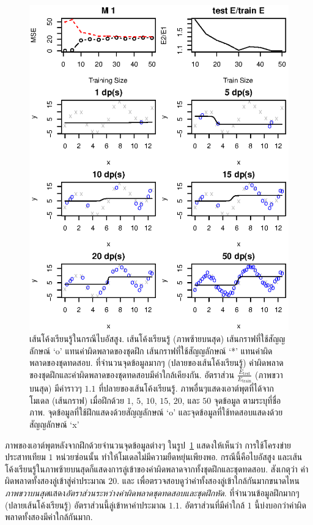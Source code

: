 %
\begin{figure}
\begin{center}
\includegraphics[width=5.5in]{04ANNlearncurve/LCHiBiasM1.eps}
\end{center}
\caption{เส้นโค้งเรียนรู้ในกรณีไบอัสสูง. 
เส้นโค้งเรียนรู้ (ภาพซ้ายบนสุด) 
เส้นกราฟที่ใช้สัญญลักษณ์ `o' แทนค่าผิดพลาดของชุดฝึก
เส้นกราฟที่ใช้สัญญลักษณ์ `*' แทนค่าผิดพลาดของชุดทดสอบ.
ที่จำนวนจุดข้อมูลมากๆ (ปลายของเส้นโค้งเรียนรู้) ค่าผิดพลาดของชุดฝึกและค่าผิดพลาดของชุดทดสอบมีค่าใกล้เคียงกัน. 
อัตราส่วน $\frac{E_{\mathrm{test}}}{E_{\mathrm{train}}}$ (ภาพขวาบนสุด) มีค่าราวๆ $1.1$ ที่ปลายของเส้นโค้งเรียนรู้.
ภาพอื่นๆแสดงเอาต์พุตที่ได้จากโมเดล (เส้นกราฟ) เมื่อฝึกด้วย $1$, $5$, $10$, $15$, $20$, และ $50$ จุดข้อมูล ตามระบุที่ชื่อภาพ.
จุดข้อมูลที่ใช้ฝึกแสดงด้วยสัญญลักษณ์ `o' และจุดข้อมูลที่ใช้ทดสอบแสดงด้วยสัญญลักษณ์ `x'
}
\label{fig: more ann learning curve high bias M1}
\end{figure}

ภาพของเอาต์พุตหลังจากฝึกด้วยจำนวนจุดข้อมูลต่างๆ ในรูป~\ref{fig: more ann learning curve high bias M1} แสดงให้เห็นว่า การใช้โครงข่ายประสาทเทียม $1$ หน่วยซ่อนนั้น ทำให้โมเดลไม่มีความยืดหยุ่นเพียงพอ.
กรณีนี้คือไบอัสสูง และเส้นโค้งเรียนรู้ในภาพซ้ายบนสุดก็แสดงการลู่เข้าของค่าผิดพลาดจากทั้งชุดฝึกและชุดทดสอบ.
สังเกตุว่า ค่าผิดพลาดทั้งสองลู่เข้าสู่ค่าประมาณ $20$.
และ เพื่อตรวจสอบดูว่าค่าทั้งสองลู่เข้าใกล้กันมากขนาดไหน 
\textit{ภาพขวาบนสุด}แสดง\textit{อัตราส่วนระหว่างค่าผิดพลาดชุดทดสอบและชุดฝึกหัด}.
ที่จำนวนข้อมูลฝึกมากๆ (ปลายเส้นโค้งเรียนรู้) อัตราส่วนนี้ลู่เข้าหาค่าประมาณ $1.1$.
อัตราส่วนที่มีค่าใกล้ $1$ นี้บ่งบอกว่าค่าผิดพลาดทั้งสองมีค่าใกล้กันมาก.

